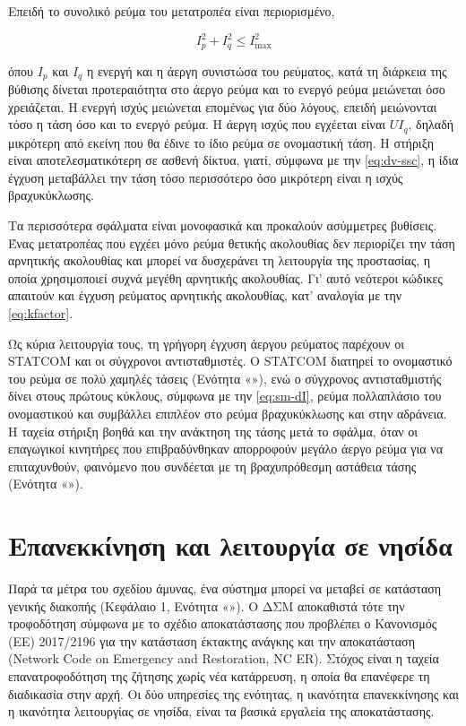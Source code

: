 Επειδή το συνολικό ρεύμα του μετατροπέα είναι περιορισμένο,

\begin{equation}
I_p^2 + I_q^2 \le I_{\max}^2
\label{eq:ilimit}
\end{equation}

όπου $I_p$ και $I_q$ η ενεργή και η άεργη συνιστώσα του ρεύματος, κατά τη διάρκεια της βύθισης
δίνεται προτεραιότητα στο άεργο ρεύμα και το ενεργό ρεύμα μειώνεται όσο χρειάζεται. Η ενεργή
ισχύς μειώνεται επομένως για δύο λόγους, επειδή μειώνονται τόσο η τάση όσο και το ενεργό ρεύμα.
Η άεργη ισχύς που εγχέεται είναι $U I_q$, δηλαδή μικρότερη από εκείνη που θα έδινε το ίδιο
ρεύμα σε ονομαστική τάση. Η στήριξη είναι αποτελεσματικότερη σε ασθενή δίκτυα, γιατί, σύμφωνα με
την \eqref{eq:dv-ssc}, η ίδια έγχυση μεταβάλλει την τάση τόσο περισσότερο όσο μικρότερη είναι η
ισχύς βραχυκύκλωσης.

Τα περισσότερα σφάλματα είναι μονοφασικά και προκαλούν ασύμμετρες βυθίσεις. Ένας μετατροπέας
που εγχέει μόνο ρεύμα θετικής ακολουθίας δεν περιορίζει την τάση αρνητικής ακολουθίας και
μπορεί να δυσχεράνει τη λειτουργία της προστασίας, η οποία χρησιμοποιεί συχνά μεγέθη αρνητικής
ακολουθίας. Γι' αυτό νεότεροι κώδικες απαιτούν και έγχυση ρεύματος αρνητικής ακολουθίας, κατ'
αναλογία με την \eqref{eq:kfactor}.

Ως κύρια λειτουργία τους, τη γρήγορη έγχυση άεργου ρεύματος παρέχουν οι STATCOM και οι
σύγχρονοι αντισταθμιστές. Ο STATCOM διατηρεί το ονομαστικό του ρεύμα σε πολύ χαμηλές τάσεις
(Ενότητα «»), ενώ ο σύγχρονος αντισταθμιστής δίνει στους πρώτους κύκλους,
σύμφωνα με την \eqref{eq:sm-dI}, ρεύμα πολλαπλάσιο του ονομαστικού και συμβάλλει επιπλέον στο
ρεύμα βραχυκύκλωσης και στην αδράνεια. Η ταχεία στήριξη βοηθά και την ανάκτηση της τάσης μετά
το σφάλμα, όταν οι επαγωγικοί κινητήρες που επιβραδύνθηκαν απορροφούν μεγάλο άεργο ρεύμα για να
επιταχυνθούν, φαινόμενο που συνδέεται με τη βραχυπρόθεσμη αστάθεια τάσης (Ενότητα
«»).

\section{Επανεκκίνηση και λειτουργία σε νησίδα}
\label{sec:restoration}

Παρά τα μέτρα του σχεδίου άμυνας, ένα σύστημα μπορεί να μεταβεί σε κατάσταση γενικής διακοπής
(Κεφάλαιο 1, Ενότητα «»). Ο ΔΣΜ αποκαθιστά τότε την τροφοδότηση σύμφωνα με
το σχέδιο αποκατάστασης που προβλέπει ο Κανονισμός (ΕΕ) 2017/2196 για την κατάσταση έκτακτης
ανάγκης και την αποκατάσταση (Network Code on Emergency and Restoration, NC ER). Στόχος είναι η
ταχεία επανατροφοδότηση της ζήτησης χωρίς νέα κατάρρευση, η οποία θα επανέφερε τη διαδικασία
στην αρχή. Οι δύο υπηρεσίες της ενότητας, η ικανότητα επανεκκίνησης και η ικανότητα
λειτουργίας σε νησίδα, είναι τα βασικά εργαλεία της αποκατάστασης.

